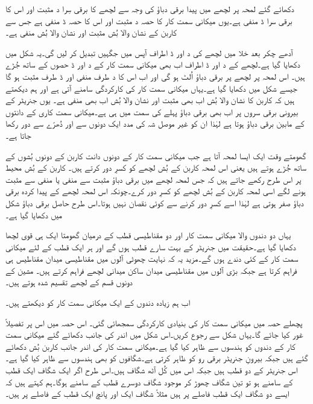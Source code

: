 دکھائے گئے لمحہ پر لچھے میں پیدا برقی دباؤ  کی وجہ سے لچھے کا برقی سِرا د مثبت اور اس کا برقی سرا ڈ منفی ہے۔یوں میکانی سمت کار کا حصہ د مثبت اور اس کا حصہ ڈ منفی ہے جس سے کاربن کے   نشان والا بُش مثبت اور  نشان والا بُش منفی ہے۔

آدھے چکر بعد خلا میں لچھے کی د اور ڈ اطراف آپس میں جگہیں تبدیل کر لیں گی۔یہ شکل  میں دکھایا گیا ہے۔لچھے کے د اور ڈ اطراف اب بھی میکانی سمت کار کے د اور ڈ حصوں کے ساتھ جُڑے ہیں۔ اس لمحہ پر لچھے پر برقی دباؤ اُلٹ ہو گی اور اب اس کا د طرف منفی اور ڈ طرف مثبت ہو گا جیسے شکل میں دکھایا گیا ہے۔یہاں میکانی سمت کار کی کارکردگی سامنے آتی ہے اور ہم دیکھتے ہیں کہ کاربن کا   نشان والا بُش اب بھی مثبت اور  نشان والا بُش اب بھی منفی ہے۔ یوں جنریٹر کے بیرونی برقی سروں پر اب بھی برقی دباؤ پہلے کی سمت میں ہی ہے۔میکانی سمت کاری کے دانتوں کے مابین برقی دباؤ ہوتا ہے لہٰذا ان کو غیر موصل شہ کی مدد ایک دونوں سے اور دُھرّے سے دور رکھا جاتا ہے۔

گھومتے وقت ایک ایسا لمحہ آتا ہے جب میکانی سمت کار کے دونوں دانت کاربن کے دونوں بُشوں کے ساتھ جُڑے ہوتے ہیں یعنی اس لمحہ کاربن کے بُش لچھے کو کسرِ دور کرتے ہیں۔ کاربن کے بُش محیط پر اس طرح رکھے جاتے ہیں کہ جس لمحہ لچھے میں برقی دباؤ مثبت سے منفی یا منفی سے مثبت ہونے لگے اسی لمحہ کاربن کے بُش لچھے کو کسرِ دور کرے۔چونکہ اس لمحہ لچھے کے پیدا کردہ برقی دباؤ صفر ہوتی ہے لہٰذا اسے کسرِ دور کرنے سے کوئی نقصان نہیں ہوتا۔اس طرح حاصل برقی دباؤ شکل میں دکھایا گیا ہے۔

یہاں دو دندوں والا میکانی سمت کار اور دو مقناطیسی قطب کے درمیان گھومتا ایک ہی قوی لچھا دکھایا گیا ہے۔حقیقت میں جنریٹر کے بہت سارے قطب ہوں گے اور ہر ایک قطب کے لئے میکانی سمت کار کے کئی دندے ہوں گے۔مزید یہ کہ نہایت چھوٹی آلوں میں مقناطیسی میدان مقناطیس ہی فراہم کرتا ہے جبکہ بڑی آلوں میں مقناطیسی میدان ساکن میدانی لچھے فراہم کرتے ہیں۔ مشین کے دونوں قسم کے لچھے تقسیم شدہ ہوتے ہیں۔

اب ہم زیادہ دندوں کے ایک میکانی سمت کار کو دیکھتے ہیں۔

پچھلے حصہ میں میکانی سمت کار کی بنیادی کارکردگی سمجھائی گئی۔ اس حصہ میں اس پر تفصیلاً غور کیا جائے گا۔یہاں شکل  سے رجوع کریں۔اس شکل میں اندر کی جانب دکھائے گئے میکانی سمت کار کے دندوں کو ہندسوں سے ظاہر کیا گیا ہے۔میکانی سمت کار کی اندر جانب کاربن بُش دکھائے گئے ہیں جبکہ  بیرونِ جنریٹر برقی رو کو ظاہر کرتی ہے۔شگافوں کو بھی ہندسوں سے ظاہر کیا گیا ہے۔اس جنریٹر کے دو قطب ہیں جبکہ اس میں کُل آٹھ شگاف ہیں۔اس طرح اگر ایک شگاف ایک قطب کے سامنے ہو تو تین شگاف چھوڑ کر موجود شگاف دوسرے قطب کے سامنے ہوگا۔ہم کہتے ہیں کہ ایسے دو شگاف ایک قطب فاصلے پر ہیں مثلاً شگاف ایک اور پانچ ایک قطب کے فاصلے پر ہیں۔

